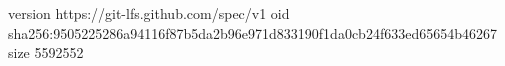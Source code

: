 version https://git-lfs.github.com/spec/v1
oid sha256:9505225286a94116f87b5da2b96e971d833190f1da0cb24f633ed65654b46267
size 5592552
